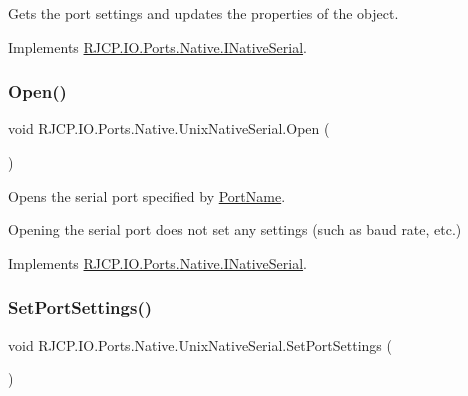 Gets the port settings and updates the properties of the object. 



Implements \mbox{\hyperlink{interface_r_j_c_p_1_1_i_o_1_1_ports_1_1_native_1_1_i_native_serial_aee35b004a7e64a44e11271261e635107}{R\+J\+C\+P.\+I\+O.\+Ports.\+Native.\+I\+Native\+Serial}}.

\mbox{\label{class_r_j_c_p_1_1_i_o_1_1_ports_1_1_native_1_1_unix_native_serial_ac8b904202bb173a4575fd8f76472de0d}} 
\subsubsection{\texorpdfstring{Open()}{Open()}}
{\footnotesize\ttfamily void R\+J\+C\+P.\+I\+O.\+Ports.\+Native.\+Unix\+Native\+Serial.\+Open (\begin{DoxyParamCaption}{ }\end{DoxyParamCaption})}



Opens the serial port specified by \mbox{\hyperlink{class_r_j_c_p_1_1_i_o_1_1_ports_1_1_native_1_1_unix_native_serial_af4193d59c957f5454dca6e3cd41ac3a4}{Port\+Name}}. 

Opening the serial port does not set any settings (such as baud rate, etc.) 

Implements \mbox{\hyperlink{interface_r_j_c_p_1_1_i_o_1_1_ports_1_1_native_1_1_i_native_serial_aad8e5adb7a536fd4645f387003bed473}{R\+J\+C\+P.\+I\+O.\+Ports.\+Native.\+I\+Native\+Serial}}.

\mbox{\label{class_r_j_c_p_1_1_i_o_1_1_ports_1_1_native_1_1_unix_native_serial_a9d3928485a0b39df2c5d72f17036b4eb}} 
\subsubsection{\texorpdfstring{SetPortSettings()}{SetPortSettings()}}
{\footnotesize\ttfamily void R\+J\+C\+P.\+I\+O.\+Ports.\+Native.\+Unix\+Native\+Serial.\+Set\+Port\+Settings (\begin{DoxyParamCaption}{ }\end{DoxyParamCaption})}



